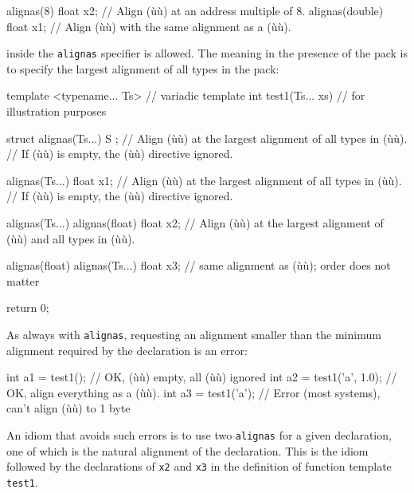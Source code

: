 \begin{emcppslisting}
alignas(8)      float x2;  // Align (ù{}ù) at an address multiple of 8.
alignas(double) float x1;  // Align (ù{}ù) with the same alignment as a (ù{}ù).
\end{emcppslisting}
    

\noindent {} inside the \lstinline!alignas! specifier is
allowed. The meaning in the presence of the pack is to specify the
largest alignment of all types in the pack:

\begin{emcppslisting}[emcppsbatch=e31]
template <typename... Ts>    // variadic template
int test1(Ts... xs)        // for illustration purposes
{
    struct alignas(Ts...) S { };
        // Align (ù{}ù) at the largest alignment of all types in (ù{}ù).
        // If (ù{}ù) is empty, the (ù{}ù) directive ignored.

    alignas(Ts...) float x1;
        // Align (ù{}ù) at the largest alignment of all types in (ù{}ù).
        // If (ù{}ù) is empty, the (ù{}ù) directive ignored.

    alignas(Ts...) alignas(float) float x2;
        // Align (ù{}ù) at the largest alignment of (ù{}ù) and all types in (ù{}ù).

    alignas(float) alignas(Ts...) float x3;
        // same alignment as (ù{}ù); order does not matter

    return 0;
}
\end{emcppslisting}
    

\noindent As always with \lstinline!alignas!, requesting an alignment smaller than
the minimum alignment required by the declaration is an error:

\begin{emcppslisting}[emcppsbatch=e31]
int a1 = test1();          // OK, (ù{}ù) empty, all (ù{}ù) ignored
int a2 = test1('a', 1.0);  // OK, align everything as a (ù{}ù).
int a3 = test1('a');       // Error (most systems), can't align (ù{}ù) to 1 byte
\end{emcppslisting}
    

\noindent An idiom that avoids such errors is to use two \lstinline!alignas! for a
given declaration, one of which is the natural alignment of the
declaration. This is the idiom followed by the declarations of
\lstinline!x2! and \lstinline!x3! in the definition of function template
\lstinline!test1!.

